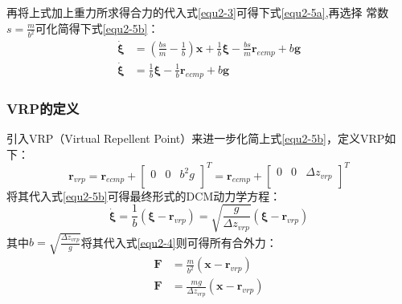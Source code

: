             再将上式加上重力所求得合力的代入式\eqref{equ2-3}可得下式\eqref{equ2-5a},再选择
            常数$s=\frac{m}{b^2}$可化简得下式\eqref{equ2-5b}：
            \begin{subequations}
                \begin{align}
                    \boldsymbol{\dot{\xi}} &= \left( \frac{bs}{m}-\frac{1}{b} \right) \boldsymbol{x}+\frac{1}{b}\boldsymbol{\xi }-\frac{bs}{m}\boldsymbol{r}_{ecmp}+b\boldsymbol{g}
                    \label{equ2-5a}\\
                    \boldsymbol{\dot{\xi}} &= \frac{1}{b}\boldsymbol{\xi }-\frac{1}{b}\boldsymbol{r}_{ecmp}+b\boldsymbol{g}
                    \label{equ2-5b}
                \end{align}
            \end{subequations}
        \subsubsection{VRP的定义}
            引入VRP（Virtual Repellent Point）来进一步化简上式\eqref{equ2-5b}，定义VRP如下：
            \begin{equation}
                \boldsymbol{r}_{vrp}=\boldsymbol{r}_{ecmp}+\left[ \begin{matrix}
                    0&		0&		b^2g\\
                \end{matrix} \right] ^T=\boldsymbol{r}_{ecmp}+\left[ \begin{matrix}
                    0&		0&		\varDelta z_{vrp}\\
                \end{matrix} \right] ^T
                \label{equ2-6}
            \end{equation}
            将其代入式\eqref{equ2-5b}可得最终形式的DCM动力学方程：
            \begin{equation}
                \boldsymbol{\dot{\xi}}=\frac{1}{b}\left( \boldsymbol{\xi }-\boldsymbol{r}_{vrp} \right) =\sqrt{\frac{g}{\varDelta z_{vrp}}}\left( \boldsymbol{\xi }-\boldsymbol{r}_{vrp} \right)
                \label{equ2-7}
            \end{equation}
            其中$b=\sqrt{\frac{\varDelta z_{vrp}}{g}}$将其代入式\eqref{equ2-4}则可得所有合外力：
            \begin{subequations}
                \begin{align}
                    \boldsymbol{F}&=\frac{m}{b^2}\left( \boldsymbol{x}-\boldsymbol{r}_{vrp} \right) 
                    \label{equ2-8a}\\
                    \boldsymbol{F}&=\frac{mg}{\varDelta z_{vrp}}\left( \boldsymbol{x}-\boldsymbol{r}_{vrp} \right) 
                    \label{equ2-8b}
                \end{align}               
            \end{subequations}
            
